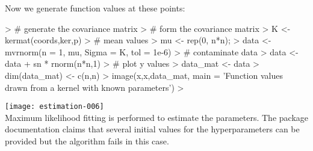 \documentclass[a4paper]{article}
\begin{document}
Now we generate function values at these points:

\begin{Schunk}
\begin{Sinput}
> # generate the covariance matrix
> # form the covariance matrix
> K <- kermat(coords,ker,p)
> # mean values
> mu <- rep(0, n*n);
> data <- mvrnorm(n = 1, mu, Sigma = K, tol = 1e-6)
> # contaminate data
> data <- data + sn * rnorm(n*n,1)
> # plot y values
> data_mat <- data
> dim(data_mat) <- c(n,n)
> image(x,x,data_mat, main = 'Function values drawn from a kernel with known parameters')
> 
\end{Sinput}
\end{Schunk}
\texttt{[image: estimation-006]}
\\
Maximum likelihood fitting is performed to estimate the parameters. The package documentation claims that several initial values for the hyperparameters can be provided but the algorithm fails in this case.
\end{document}
